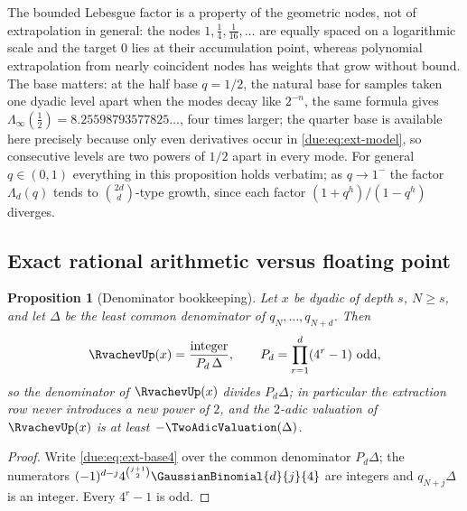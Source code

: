 \documentclass[11pt,oneside]{article}
\theoremstyle{plain}
\newtheorem{proposition}[theorem]{Proposition}
\theoremstyle{definition}
\theoremstyle{remark}
\newcommand{\upn}[1]{\RvachevUp_{#1}}
\newcommand{\qn}[1]{q_{#1}}                                 %
\begin{document}
The bounded Lebesgue factor is a property of the geometric nodes, not of
extrapolation in general: the nodes $1,\tfrac14,\tfrac1{16},\ldots$ are
equally spaced on a logarithmic scale and the target $0$ lies at their
accumulation point, whereas polynomial extrapolation from nearly coincident
nodes has weights that grow without bound.  The base matters: at the half
base $q=1/2$, the natural base for samples taken one dyadic level apart when
the modes decay like $2^{-n}$, the same formula gives
$\Lambda_{\infty}(\tfrac12)=8.25598793577825\ldots$, four times larger; the
quarter base is available here precisely because only even derivatives occur
in \cref{due:eq:ext-model}, so consecutive levels are two powers of $1/2$
apart in every mode.  For general $q\in(0,1)$ everything in this proposition
holds verbatim; as $q\to1^{-}$ the factor $\Lambda_{d}(q)$ tends to
$\binom{2d}{d}$-type growth, since each factor $(1+q^{h})/(1-q^{h})$ diverges.

\subsection{Exact rational arithmetic versus floating point}

\begin{proposition}[Denominator bookkeeping]
\label{due:prop:stab-denominator}
Let $x$ be dyadic of depth $s$, $N\ge s$, and let $\Delta$ be the least
common denominator of $\qn{N},\ldots,\qn{N+d}$.  Then
\begin{equation}
 \RvachevUp(x)=\frac{\text{integer}}{P_{d}\,\Delta},
 \qquad P_{d}=\prod_{r=1}^{d}(4^{r}-1)\ \text{odd},
 \label{due:eq:stab-denominator}
\end{equation}
so the denominator of $\RvachevUp(x)$ divides $P_{d}\Delta$; in particular
the extraction row never introduces a new power of $2$, and the $2$-adic
valuation of $\RvachevUp(x)$ is at least $-\TwoAdicValuation(\Delta)$.
\end{proposition}

\begin{proof}
Write \cref{due:eq:ext-base4} over the common denominator $P_{d}\Delta$; the
numerators $(-1)^{d-j}4^{\binom{j+1}{2}}\GaussianBinomial{d}{j}{4}$ are
integers and $\qn{N+j}\Delta$ is an integer.  Every $4^{r}-1$ is odd.
\end{proof}
\end{document}
